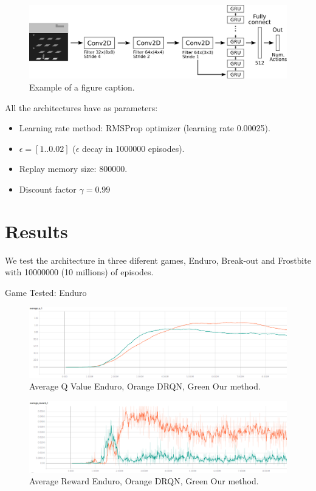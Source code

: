 \documentclass[conference]{IEEEtran}
\begin{document}
\begin{figure}[htbp]
\centerline{\includegraphics[width=\linewidth]{images/DGQN.png}}
\caption{Example of a figure caption.}
\label{dgrqn}
\end{figure}

All the architectures have as parameters:

\begin{itemize}
\item Learning rate method: RMSProp optimizer (learning rate 0.00025).
\item $\epsilon=[1 .. 0.02]$ ($\epsilon$ decay in 1000000 episodes).
\item Replay memory size: 800000.
\item Discount factor $\gamma = 0.99$
\end{itemize}



\section{Results}

We test the architecture in three diferent games, Enduro, Break-out and Frostbite with 10000000 (10 millions) of episodes.

Game Tested:
Enduro
\begin{figure}[htbp]
\centerline{\includegraphics[width=\linewidth]{images/enduro-averQ-drqn-or-dgruqn-gr.png}}
\caption{Average Q Value Enduro, Orange DRQN, Green Our method.}
\label{enduro-q}
\end{figure}

\begin{figure}[htbp]
\centerline{\includegraphics[width=\linewidth]{images/enduro-av-rew-drqn-or-dgruqn-gr.png}}
\caption{Average Reward Enduro, Orange DRQN, Green Our method.}
\label{enduro-r}
\end{figure}
\end{document}

